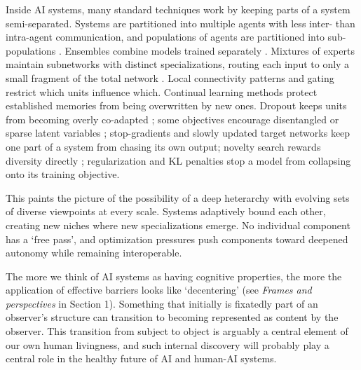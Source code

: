 \documentclass[11pt]{article}
\begin{document}
Inside AI systems, many standard techniques work by keeping parts of a system semi-separated. Systems are partitioned into multiple agents with less inter- than intra-agent communication, and populations of agents are partitioned into sub-populations \citep{hammond2025multi, holland1975adaptation, jaderberg2019human}. Ensembles combine models trained separately \citep{lakshminarayanan2017simple}. Mixtures of experts maintain subnetworks with distinct specializations, routing each input to only a small fragment of the total network \citep{shazeer2017outrageously}. Local connectivity patterns and gating restrict which units influence which. Continual learning methods protect established memories from being overwritten by new ones. Dropout keeps units from becoming overly co-adapted \citep{srivastava2014dropout}; some objectives encourage disentangled or sparse latent variables \citep{higgins2017betavae, cunningham2024sparse}; stop-gradients and slowly updated target networks keep one part of a system from chasing its own output; novelty search rewards diversity directly \citep{lehman2011abandoning}; regularization and KL penalties stop a model from collapsing onto its training objective.

This paints the picture of the possibility of a deep heterarchy with evolving sets of diverse viewpoints at every scale. Systems adaptively bound each other, creating new niches where new specializations emerge. No individual component has a `free pass', and optimization pressures push components toward deepened autonomy while remaining interoperable.


The more we think of AI systems as having cognitive properties, the more the application of effective barriers looks like `decentering' (see \textit{Frames and perspectives} in Section 1). Something that initially is fixatedly part of an observer's structure can transition to becoming represented as content by the observer. This transition from subject to object is arguably a central element of our own human livingness, and such internal discovery will probably play a central role in the healthy future of AI and human-AI systems.

\end{document}
